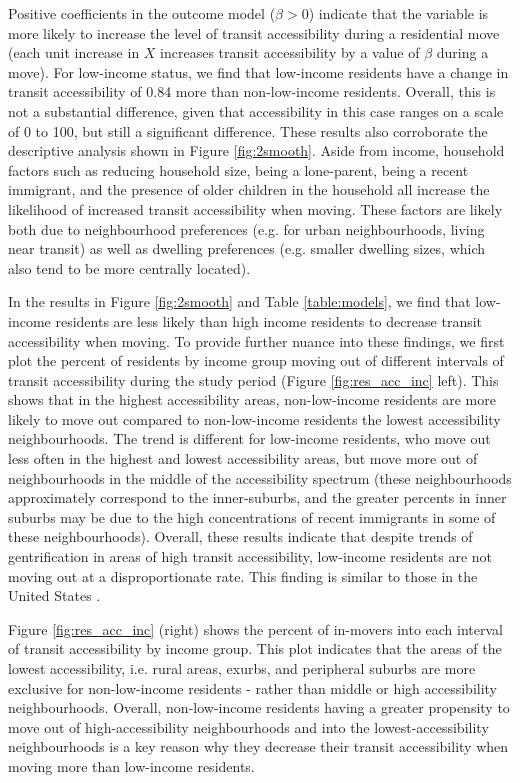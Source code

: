 Positive coefficients in the outcome model ($\beta > 0$) indicate that the variable is more likely to increase the level of transit accessibility during a residential move (each unit increase in $X$ increases transit accessibility by a value of $\beta$ during a move). For low-income status, we find that low-income residents have a change in transit accessibility of 0.84 more than non-low-income residents. Overall, this is not a substantial difference, given that accessibility in this case ranges on a scale of 0 to 100, but still a significant difference. These results also corroborate the descriptive analysis shown in Figure \ref{fig:2smooth}. Aside from income, household factors such as reducing household size, being a lone-parent, being a recent immigrant, and the presence of older children in the household all increase the likelihood of increased transit accessibility when moving. These factors are likely both due to neighbourhood preferences (e.g. for urban neighbourhoods, living near transit) as well as dwelling preferences (e.g. smaller dwelling sizes, which also tend to be more centrally located).




In the results in Figure \ref{fig:2smooth} and Table \ref{table:models}, we find that low-income residents are less likely than high income residents to decrease transit accessibility when moving. To provide further nuance into these findings, we first plot the percent of residents by income group moving out of different intervals of transit accessibility during the study period (Figure \ref{fig:res_acc_inc} left). This shows that in the highest accessibility areas, non-low-income residents are more likely to move out compared to non-low-income residents the lowest accessibility neighbourhoods. The trend is different for low-income residents, who move out less often in the highest and lowest accessibility areas, but move more out of neighbourhoods in the middle of the accessibility spectrum (these neighbourhoods approximately correspond to the inner-suburbs, and the greater percents in inner suburbs may be due to the high concentrations of recent immigrants in some of these neighbourhoods). Overall, these results indicate that despite trends of gentrification in areas of high transit accessibility, low-income residents are not moving out at a disproportionate rate. This finding is similar to those in the United States \cite{freeman_displacement_2005,delmelle_new_2020}. 

Figure \ref{fig:res_acc_inc} (right) shows the percent of in-movers into each interval of transit accessibility by income group. This plot indicates that the areas of the lowest accessibility, i.e. rural areas, exurbs, and peripheral suburbs are more exclusive for non-low-income residents - rather than middle or high accessibility neighbourhoods. Overall, non-low-income residents having a greater propensity to move out of high-accessibility neighbourhoods and into the lowest-accessibility neighbourhoods is a key reason why they decrease their transit accessibility when moving more than low-income residents.



